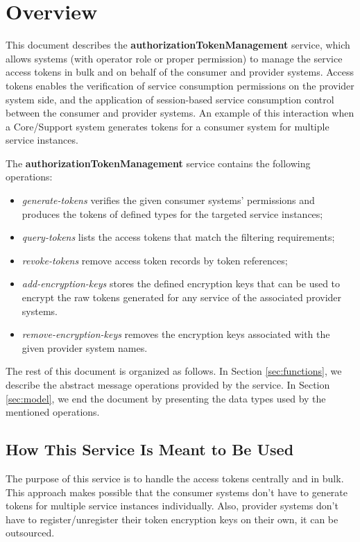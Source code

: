 \documentclass[a4paper]{arrowhead}
\begin{document}
\section{Overview}
\label{sec:overview}
This document describes the \textbf{authorizationTokenManagement} service, which allows systems (with operator role or proper permission) to manage the service access tokens in bulk and on behalf of the consumer and provider systems. Access tokens enables the verification of service consumption permissions on the provider system side, and the application of session-based service consumption control between the consumer and provider systems. An example of this interaction when a Core/Support system generates tokens for a consumer system for multiple service instances.

The \textbf{authorizationTokenManagement} service contains the following operations:

\begin{itemize}
    \item \textit{generate-tokens} verifies the given consumer systems' permissions and produces the tokens of defined types for the targeted service instances;
    \item \textit{query-tokens} lists the access tokens that match the filtering requirements;
    \item \textit{revoke-tokens} remove access token records by token references;
    \item \textit{add-encryption-keys} stores the defined encryption keys that can be used to encrypt the raw tokens generated for any service of the associated provider systems.
    \item \textit{remove-encryption-keys} removes the encryption keys associated with the given provider system names.
\end{itemize}

The rest of this document is organized as follows.
In Section \ref{sec:functions}, we describe the abstract message operations provided by the service.
In Section \ref{sec:model}, we end the document by presenting the data types used by the mentioned operations.

\subsection{How This Service Is Meant to Be Used}

The purpose of this service is to handle the access tokens centrally and in bulk. This approach makes
possible that the consumer systems don't have to generate tokens for multiple service instances individually. Also, provider systems don't have to register/unregister their token encryption keys on their own, it can be outsourced.
\end{document}
